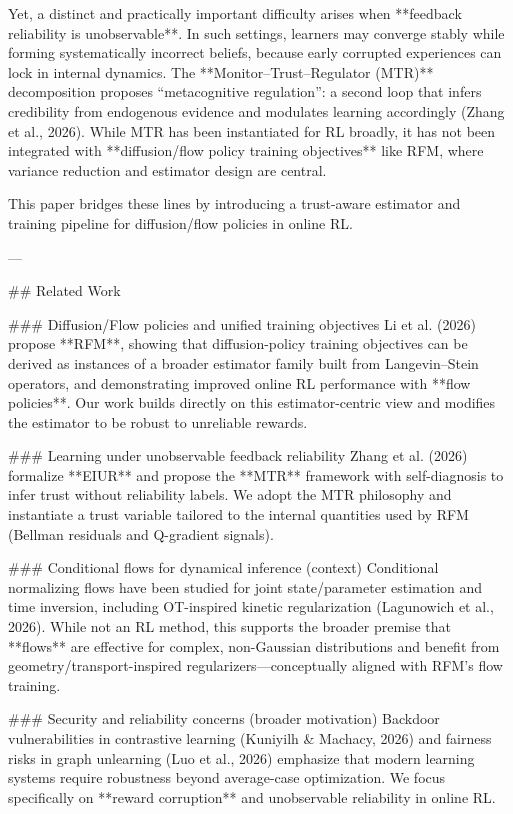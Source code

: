 Yet, a distinct and practically important difficulty arises when **feedback reliability is unobservable**. In such settings, learners may converge stably while forming systematically incorrect beliefs, because early corrupted experiences can lock in internal dynamics. The **Monitor–Trust–Regulator (MTR)** decomposition proposes “metacognitive regulation”: a second loop that infers credibility from endogenous evidence and modulates learning accordingly (Zhang et al., 2026). While MTR has been instantiated for RL broadly, it has not been integrated with **diffusion/flow policy training objectives** like RFM, where variance reduction and estimator design are central.

This paper bridges these lines by introducing a trust-aware estimator and training pipeline for diffusion/flow policies in online RL.

---

## Related Work  

### Diffusion/Flow policies and unified training objectives  
Li et al. (2026) propose **RFM**, showing that diffusion-policy training objectives can be derived as instances of a broader estimator family built from Langevin–Stein operators, and demonstrating improved online RL performance with **flow policies**. Our work builds directly on this estimator-centric view and modifies the estimator to be robust to unreliable rewards.

### Learning under unobservable feedback reliability  
Zhang et al. (2026) formalize **EIUR** and propose the **MTR** framework with self-diagnosis to infer trust without reliability labels. We adopt the MTR philosophy and instantiate a trust variable tailored to the internal quantities used by RFM (Bellman residuals and Q-gradient signals).

### Conditional flows for dynamical inference (context)  
Conditional normalizing flows have been studied for joint state/parameter estimation and time inversion, including OT-inspired kinetic regularization (Lagunowich et al., 2026). While not an RL method, this supports the broader premise that **flows** are effective for complex, non-Gaussian distributions and benefit from geometry/transport-inspired regularizers—conceptually aligned with RFM’s flow training.

### Security and reliability concerns (broader motivation)  
Backdoor vulnerabilities in contrastive learning (Kuniyilh & Machacy, 2026) and fairness risks in graph unlearning (Luo et al., 2026) emphasize that modern learning systems require robustness beyond average-case optimization. We focus specifically on **reward corruption** and unobservable reliability in online RL.

